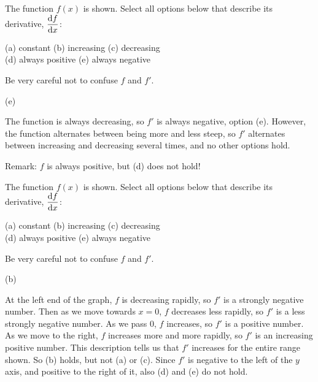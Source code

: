 \begin{question}
The function $f(x)$ is shown. Select all options below that describe its derivative, $\ds\diff{f}{x}$:
\begin{center}
(a) constant \qquad (b) increasing
\qquad (c) decreasing\\
 (d) always positive
\qquad (e) always negative

\end{center}
\end{question}
\begin{hint} Be very careful not to confuse $f$ and $f'$.
\end{hint}
\begin{answer} (e)
\end{answer}
\begin{solution} The function is always decreasing, so $f'$ is always negative, option (e). However, the function alternates between being more and less steep, so $f'$ alternates between increasing and decreasing several times, and no other options hold.

 Remark: $f$ is always positive, but (d) does not hold!
\end{solution}


\begin{Mquestion}
The function $f(x)$ is shown. Select all options below that describe its derivative, $\ds\diff{f}{x}$:
\begin{center}
(a) constant \qquad (b) increasing
\qquad (c) decreasing\\ (d) always positive
\qquad (e) always negative

\end{center}
\end{Mquestion}
\begin{hint} Be very careful not to confuse $f$ and $f'$.
\end{hint}
\begin{answer} (b)
\end{answer}
\begin{solution}
At the left end of the graph, $f$ is decreasing rapidly, so $f'$ is a strongly negative number. Then as we move towards $x=0$, $f$ decreases less rapidly, so $f'$ is a less strongly negative number. As we pass 0, $f$ increases, so $f'$ is a positive number. As we move to the right, $f$ increases more and more rapidly, so $f'$ is an increasing positive number. This description tells us that $f'$ increases for the entire range shown. So (b) holds, but not (a) or (c). Since $f'$ is negative to the left of the $y$ axis, and positive to the right of it, also (d) and (e) do not hold.
\end{solution}


